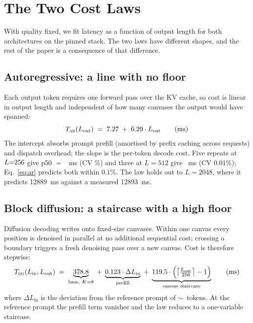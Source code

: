 \section{The Two Cost Laws}
\label{sec:laws}

With quality fixed, we fit latency as a function of output length for both
architectures on the pinned stack. The two laws have different shapes, and the
rest of the paper is a consequence of that difference.

\subsection{Autoregressive: a line with no floor}

Each output token requires one forward pass over the KV cache, so cost is
linear in output length and independent of how many canvases the output would
have spanned:
\begin{equation}
\label{eq:ar}
T_{\textsc{ar}}(L_{\mathrm{out}}) \;=\; 7.27 \;+\; 6.29 \cdot L_{\mathrm{out}}
\qquad\text{(ms)}
\end{equation}
The intercept absorbs prompt prefill (amortised by prefix caching across
requests) and dispatch overhead; the slope is the per-token decode cost. Five
repeats at $L{=}256$ give p50 $=$ \arAnchorTwoFive~ms
(CV \arCV\%) and three at $L{=}512$ give \arAnchorFiveOne~ms (CV $0.01\%$);
Eq.~\ref{eq:ar} predicts both within $0.1\%$. The law holds out to $L{=}2048$,
where it predicts \num{12889}~ms against a measured \num{12893}~ms.

\subsection{Block diffusion: a staircase with a high floor}

Diffusion decoding writes onto fixed-size canvases. Within one canvas every
position is denoised in parallel at no additional sequential cost; crossing a
boundary triggers a fresh denoising pass over a new canvas. Cost is therefore
stepwise:
\begin{equation}
\label{eq:dg}
T_{\textsc{dg}}(L_{\mathrm{in}}, L_{\mathrm{out}}) \;=\;
\underbrace{378.8}_{\text{base, } K=8} \;+\;
\underbrace{0.123 \cdot \Delta L_{\mathrm{in}}}_{\text{prefill}} \;+\;
\underbrace{119.5 \cdot \Bigl(\bigl\lceil \tfrac{L_{\mathrm{out}}}{256}\bigr\rceil - 1\Bigr)}_{\text{canvas staircase}}
\qquad\text{(ms)}
\end{equation}
where $\Delta L_{\mathrm{in}}$ is the deviation from the reference prompt of
$\sim$\ tokens. At the reference prompt the prefill term vanishes
and the law reduces to a one-variable staircase.

